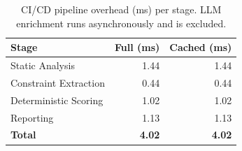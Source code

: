 \begin{table}[t]
\centering
\caption{CI/CD pipeline overhead (ms) per stage. LLM enrichment runs asynchronously and is excluded.}
\label{tab:cicd_overhead}
\begin{tabular}{lrr}
\toprule
Stage & Full (ms) & Cached (ms) \\
\midrule
Static Analysis & 1.44 & 1.44 \\
Constraint Extraction & 0.44 & 0.44 \\
Deterministic Scoring & 1.02 & 1.02 \\
Reporting & 1.13 & 1.13 \\
\midrule
\textbf{Total} & \textbf{4.02} & \textbf{4.02} \\
\bottomrule
\end{tabular}
\end{table}